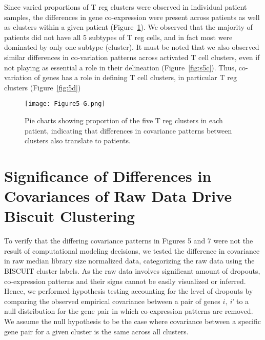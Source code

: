 Since varied proportions of T reg clusters were observed in individual patient samples, the differences in gene co-expression were present across patients as well as clusters within a given patient (Figure~\ref{fig:5g}).
We observed that the majority of patients did not have all 5 subtypes of T reg cells, and in fact most were dominated by only one subtype (cluster).
It must be noted that we also observed similar differences in co-variation patterns across activated T cell clusters, even if not playing as essential a role in their delineation (Figure~\ref{fig:s5c}).
Thus, co-variation of genes has a role in defining T cell clusters, in particular T reg clusters (Figure~\ref{fig:5d})

\begin{figure}
\centering
\texttt{[image: Figure5-G.png]}
\caption{Pie charts showing proportion of the five T reg clusters in each patient, indicating that differences in covariance patterns between clusters also translate to patients.
}
\label{fig:5g}
\end{figure}

\section{Significance of Differences in Covariances of Raw Data Drive Biscuit Clustering}

To verify that the differing covariance patterns in Figures 5 and 7 were not the result of computational modeling decisions, we tested the difference in covariance in raw median library size normalized data, categorizing the raw data using the BISCUIT cluster labels.  
As the raw data involves significant amount of dropouts, co-expression patterns and their signs cannot be easily visualized or inferred.
Hence, we performed hypothesis testing accounting for the level of dropouts by comparing the observed empirical covariance between a pair of genes \(i,\ i'\ \)to a null distribution for the gene pair in which co-expression patterns are removed.
We assume the null hypothesis to be the case where covariance between a specific gene pair for a given cluster is the same across all clusters.

